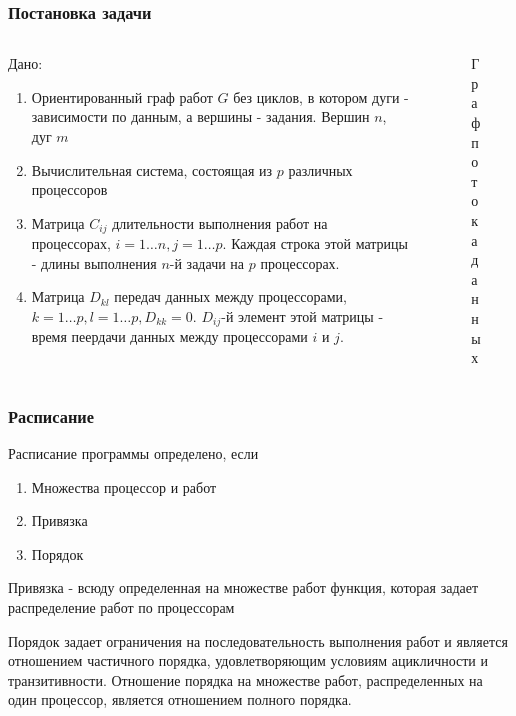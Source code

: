 \begin{frame}
    \frametitle{Постановка задачи}
    \begin{columns}
        \begin{column}{0.60\textwidth}
            Дано:
            \begin{enumerate}
                \item Ориентированный граф работ $G$ без циклов, в котором дуги - зависимости по данным, а вершины - задания. Вершин $n$, дуг $m$
                \item Вычислительная система, состоящая из $p$ различных процессоров
                \item Матрица $C_{ij}$ длительности выполнения работ на процессорах, $i=1 \dots n, j=1 \dots p$. Каждая строка этой матрицы - длины выполнения $n$-й задачи на $p$ процессорах. 
                \item Матрица $D_{kl}$ передач данных между процессорами, $k=1 \dots p, l = 1 \dots p, D_{kk} = 0$. $D_{ij}$-й элемент этой матрицы - время пеердачи данных между процессорами $i$ и $j$.
            \end{enumerate}
        \end{column}
        \begin{column}{0.40\textwidth}
            \begin{figure}
                \captionsetup{labelformat=empty}
                \caption{Граф потока данных}
            \end{figure}
        \end{column}
    \end{columns}
\end{frame}

\begin{frame}
    \frametitle{Расписание}
    Расписание программы определено, если
    \begin{enumerate}
        \item Множества процессор и работ
        \item Привязка
        \item Порядок
    \end{enumerate}
    \par
    Привязка - всюду определенная на множестве работ функция, которая задает распределение работ по процессорам
    \par
    Порядок задает ограничения на последовательность выполнения работ и является отношением частичного порядка, удовлетворяющим условиям ацикличности и транзитивности. Отношение порядка на множестве работ, распределенных на \\один процессор, является отношением полного порядка.
\end{frame}

